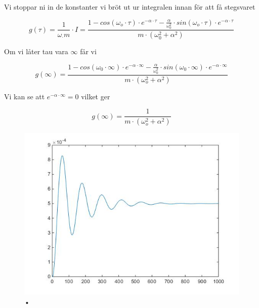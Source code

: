 \documentclass[10pt,a4paper]{article}
\begin{document}
Vi stoppar ni in de konstanter vi bröt ut ur integralen innan för att få stegsvaret

\begin{equation}
g(\tau)= \frac{1}{\omega_ \cdot m} \cdot I = \frac{1-cos(\omega_o \cdot \tau) \cdot e^{-\alpha \cdot \tau} - \frac{\alpha}{\omega_0^2} \cdot sin(\omega_o \cdot \tau) \cdot e^{-\alpha \cdot \tau}}{m\cdot (\omega_0^2 + \alpha^2)}
\end{equation}

Om vi låter tau vara $\infty$ får vi

\begin{equation}
g(\infty) = \frac{1 - cos(\omega_0 \cdot \infty) \cdot e^{-\alpha \cdot \infty}
- \frac{\alpha}{\omega_0^2} \cdot sin(\omega_0 \cdot \infty) \cdot e^{-\alpha \cdot \infty}}{m \cdot (\omega_o^2 +\alpha^2)}
\end{equation}

Vi kan se att $e^{-\alpha \cdot \infty} = 0$ vilket ger

\begin{equation}
g(\infty) = \frac{1}{m \cdot (\omega_o^2 +\alpha^2)}
\end{equation}

\begin{figure}
\begin{center}
\includegraphics[scale=0.5]{Stegsvar}
\caption{•}
\end{center}
\end{figure}
\end{document}
